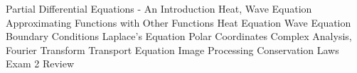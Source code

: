 \documentclass{article}
\begin{document}
\maketitle

\newpage

\tableofcontents
%
\newpage
%
{Partial Differential Equations - An Introduction}
{Heat, Wave Equation}
{Approximating Functions with Other Functions}
{Heat Equation}
{Wave Equation}
{Boundary Conditions}
{Laplace's Equation}
{Polar Coordinates}
{Complex Analysis, Fourier Transform}
{Transport Equation}
{Image Processing}
{Conservation Laws}
{Exam 2 Review}
\end{document}
